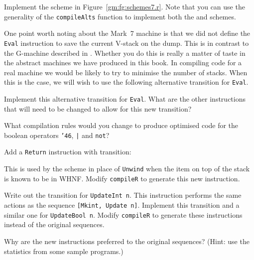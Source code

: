 \begin{exercise}\label{gm:X:comp7r}
Implement the \tR{} scheme in Figure~\ref{gm:fg:schemes7.r}.  Note that
you can use the generality of the \mbox{\tt compileAlts} function to implement
both the \tAR{} and \tAltE{} schemes.
\end{exercise}

One point worth noting about the Mark~7 machine is that we did not
define the \mbox{\tt Eval} instruction to save the current V-stack on the dump.
This is in contrast to the G-machine described in \cite{PJBook}.
Whether you do this is really a matter of taste in the abstract
machines we have produced in this book. In compiling code for a real
machine we would be likely to try to minimise the number of stacks.
When this is the case, we will wish to use the following alternative
transition for \mbox{\tt Eval}.

\gmruleodv%
{}%
{}

\begin{exercise}
Implement this alternative transition for \mbox{\tt Eval}. What are the other
instructions that will need to be changed to allow for this new
transition?
\end{exercise}

\begin{exercise}
What compilation rules would you change to produce optimised code
for the boolean operators \mbox{\tt {\char'46}}, \mbox{\tt |} and \mbox{\tt not}?
\end{exercise}

\begin{exercise}
Add a \mbox{\tt Return} instruction with transition:

\gmruleodv%
{}%
{}

This is used by the \tR{} scheme in place of \mbox{\tt Unwind} when the item on
top of the stack is known to be in WHNF. Modify \mbox{\tt compileR} to generate
this new instruction.
\end{exercise}

\begin{exercise}
Write out the transition for \mbox{\tt UpdateInt\ n}. This instruction performs
the same actions as the sequence \mbox{\tt [Mkint,\ Update\ n]}. Implement this
transition and a similar one for \mbox{\tt UpdateBool\ n}. Modify \mbox{\tt compileR} to
generate these instructions instead of the original sequences.

Why are the new instructions preferred to the original sequences?
(Hint: use the statistics from some sample programs.)
\end{exercise}

